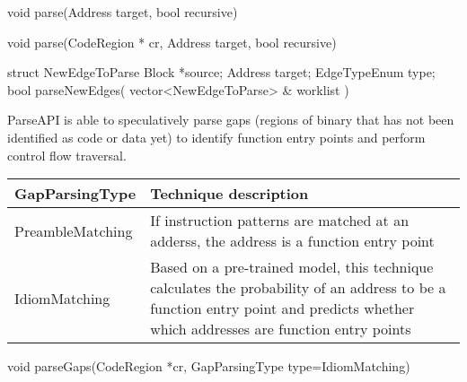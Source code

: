 \begin{apient}
void parse(Address target,
           bool recursive)
\end{apient}

\begin{apient}
void parse(CodeRegion * cr,
           Address target,
           bool recursive)
\end{apient}

\begin{apient}
struct NewEdgeToParse {
    Block *source;
    Address target;
    EdgeTypeEnum type;
}
bool parseNewEdges( vector<NewEdgeToParse> & worklist )
\end{apient}

ParseAPI is able to speculatively parse gaps 
(regions of binary that has not been identified as code or data yet)
to identify function entry points and
perform control flow traversal.

\begin{center}
\begin{tabular}{lp{10cm}}
\toprule
GapParsingType & Technique description \\
\midrule
PreambleMatching & If instruction patterns are matched at an adderss, the address is a function entry point  \\
IdiomMatching & Based on a pre-trained model, this technique calculates the probability of an address to be a function entry point and predicts whether which addresses are function entry points\\
\bottomrule
\end{tabular}
\end{center}

\begin{apient}
void parseGaps(CodeRegion *cr,
               GapParsingType type=IdiomMatching)
\end{apient}

